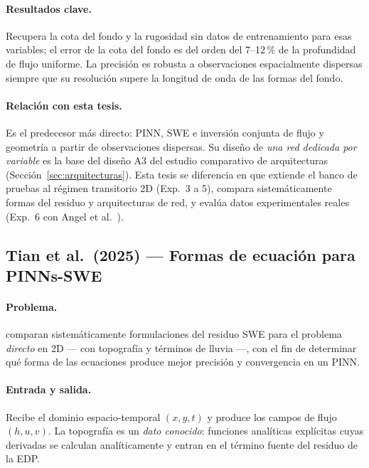 \paragraph{Resultados clave.}
Recupera la cota del fondo y la rugosidad sin datos de entrenamiento para esas
variables; el error de la cota del fondo es del orden del 7--12\,\% de la
profundidad de flujo uniforme. La precisión es robusta a observaciones
espacialmente dispersas siempre que su resolución supere la longitud de onda de
las formas del fondo.

\paragraph{Relación con esta tesis.}
Es el predecesor más directo: PINN, SWE e inversión conjunta de flujo y
geometría a partir de observaciones dispersas. Su diseño de \emph{una red
dedicada por variable} es la base del diseño A3 del estudio comparativo de
arquitecturas (Sección~\ref{sec:arquitecturas}). Esta tesis se diferencia en
que extiende el banco de pruebas al régimen transitorio 2D (Exp.~3 a 5),
compara sistemáticamente formas del residuo y arquitecturas de red, y evalúa
datos experimentales reales (Exp.~6 con Angel et al.\ \cite{angel2024}).

\subsection{Tian et al.\ (2025) --- Formas de ecuación para PINNs-SWE}
\label{sec:lit:tian}

\paragraph{Problema.}
\cite{tian2025} comparan sistemáticamente formulaciones del residuo SWE para el
problema \emph{directo} en 2D --- con topografía y términos de lluvia ---, con
el fin de determinar qué forma de las ecuaciones produce mejor precisión y
convergencia en un PINN.

\paragraph{Entrada y salida.}
Recibe el dominio espacio-temporal $(x,y,t)$ y produce los campos de flujo
$(h,u,v)$. La topografía es un \emph{dato conocido}: funciones analíticas
explícitas cuyas derivadas se calculan analíticamente y entran en el término
fuente del residuo de la EDP.

